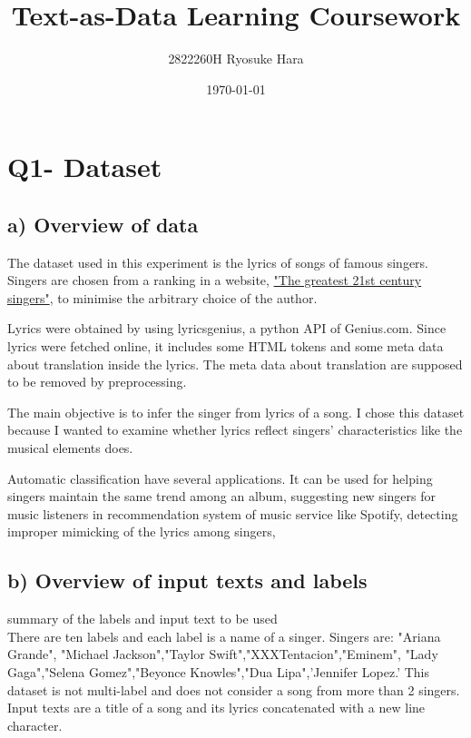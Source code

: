 \documentclass[a4paper,11pt]{article}
\begin{document}
\title{Text-as-Data Learning Coursework}
\author{2822260H Ryosuke Hara}
\date{\today}
\maketitle

\section{Q1- Dataset}
\subsection{a) Overview of data}%
The dataset used in this experiment is the lyrics of songs of famous singers.
Singers are chosen from a ranking in a website, \href{https://www.thefamouspeople.com/21st-century-singers.php}{"The greatest 21st century singers"}, to minimise the arbitrary choice of the author.

Lyrics were obtained by using lyricsgenius, a python API of Genius.com.
Since lyrics were fetched online, it includes some HTML tokens and some meta data about translation inside the lyrics.
The meta data about translation are supposed to be removed by preprocessing.


The main objective is to infer the singer from lyrics of a song.
I chose this dataset because I wanted to examine whether lyrics reflect singers' characteristics like the musical elements does.

Automatic classification have several applications.
It can be used for helping singers maintain the same trend among an album,
suggesting new singers for music listeners in recommendation system of music service like Spotify, 
detecting improper mimicking of the lyrics among singers, 

\subsection{b) Overview of input texts and labels}
summary of the labels and input text to be used \\

There are ten labels and each label is a name of a singer.
Singers are: "Ariana Grande", "Michael Jackson","Taylor Swift","XXXTentacion","Eminem", "Lady Gaga","Selena Gomez","Beyonce Knowles","Dua Lipa",'Jennifer Lopez.'
This dataset is not multi-label and does not consider a song from more than 2 singers.
Input texts are a title of a song and its lyrics concatenated with a new line character.
\end{document}
